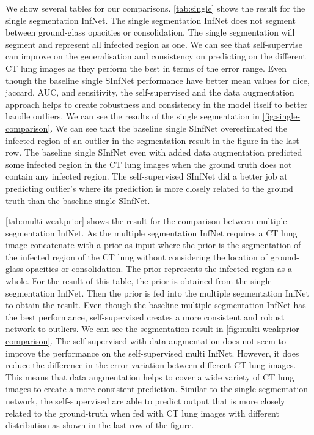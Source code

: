  We show several tables for our comparisons. \ref{tab:single} shows the result for the single segmentation InfNet. The single segmentation InfNet does not segment between ground-glass opacities or consolidation. The single segmentation will segment and represent all infected region as one. We can see that self-supervise can improve on the generalisation and consistency on predicting on the different CT lung images as they perform the best in terms of the error range. Even though the baseline single SInfNet performance have better mean values for dice, jaccard, AUC, and sensitivity, the self-supervised and the data augmentation approach helps to create robustness and consistency in the model itself to better handle outliers. We can see the results of the single segmentation in \ref{fig:single-comparison}. We can see that the baseline single SInfNet overestimated the infected region of an outlier in the segmentation result in the figure in the last row. The baseline single SInfNet even with added data augmentation predicted some infected region in the CT lung images when the ground truth does not contain any infected region. The self-supervised SInfNet did a better job at predicting outlier's where its prediction is more closely related to the ground truth than the baseline single SInfNet.
 
 \ref{tab:multi-weakprior} shows the result for the comparison between multiple segmentation InfNet. As the multiple segmentation InfNet requires a CT lung image concatenate with a prior as input where the prior is the segmentation of the infected region of the CT lung without considering the location of ground-glass opacities or consolidation. The prior represents the infected region as a whole. For the result of this table, the prior is obtained from the single segmentation InfNet. Then the prior is fed into the multiple segmentation InfNet to obtain the result. Even though the baseline multiple segmentation InfNet has the best performance, self-supervised  creates a more consistent and robust network to outliers. We can see the segmentation result in \ref{fig:multi-weakprior-comparison}. The self-supervised with data augmentation does not seem to improve the performance on the self-supervised multi InfNet. However, it does reduce the difference in the error variation between different CT lung images. This means that data augmentation helps to cover a wide variety of CT lung images to create a more consistent prediction. Similar to the single segmentation network, the self-supervised are able to predict output that is more closely related to the ground-truth when fed with CT lung images with different distribution as shown in the last row of the figure. 
   
